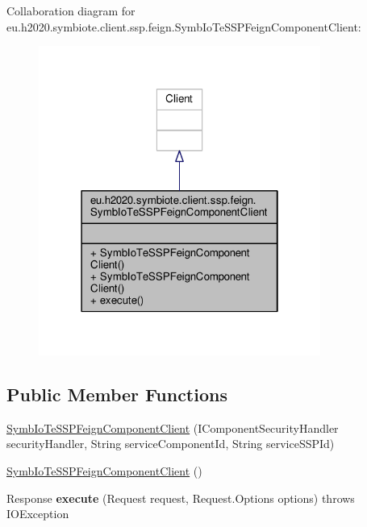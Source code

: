 Collaboration diagram for eu.\+h2020.\+symbiote.\+client.\+ssp.\+feign.\+Symb\+Io\+Te\+S\+S\+P\+Feign\+Component\+Client\+:
\nopagebreak
\begin{figure}[H]
\begin{center}
\leavevmode
\includegraphics[width=262pt]{classeu_1_1h2020_1_1symbiote_1_1client_1_1ssp_1_1feign_1_1SymbIoTeSSPFeignComponentClient__coll__graph}
\end{center}
\end{figure}
\subsection*{Public Member Functions}
\begin{DoxyCompactItemize}
\item 
\hyperlink{classeu_1_1h2020_1_1symbiote_1_1client_1_1ssp_1_1feign_1_1SymbIoTeSSPFeignComponentClient_a7c0f4dd8e298fb895d69a0c532dd3ded}{Symb\+Io\+Te\+S\+S\+P\+Feign\+Component\+Client} (I\+Component\+Security\+Handler security\+Handler, String service\+Component\+Id, String service\+S\+S\+P\+Id)
\item 
\hyperlink{classeu_1_1h2020_1_1symbiote_1_1client_1_1ssp_1_1feign_1_1SymbIoTeSSPFeignComponentClient_a925bf1c211deee7ebf9555259ecdc636}{Symb\+Io\+Te\+S\+S\+P\+Feign\+Component\+Client} ()
\item 
\mbox{\label{classeu_1_1h2020_1_1symbiote_1_1client_1_1ssp_1_1feign_1_1SymbIoTeSSPFeignComponentClient_ad39f4e73e8e3382f6d6a87859115b184}} 
Response {\bfseries execute} (Request request, Request.\+Options options)  throws I\+O\+Exception 
\end{DoxyCompactItemize}


